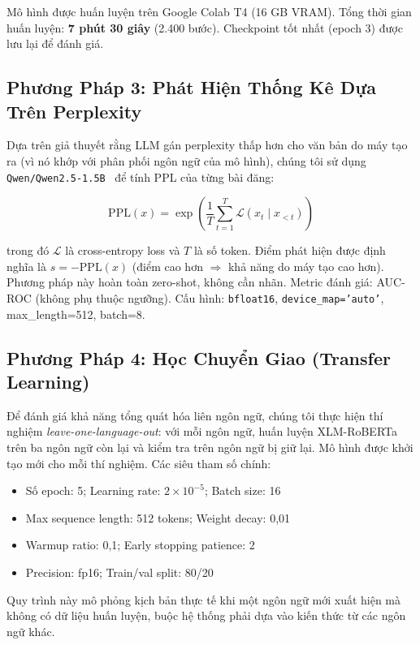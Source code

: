 Mô hình được huấn luyện trên Google Colab T4 (16 GB VRAM). Tổng thời
gian huấn luyện: \textbf{7 phút 30 giây} (2.400 bước). Checkpoint tốt
nhất (epoch 3) được lưu lại để đánh giá.

\subsection{Phương Pháp 3: Phát Hiện Thống Kê Dựa Trên Perplexity}

Dựa trên giả thuyết rằng LLM gán perplexity thấp hơn cho văn bản do
máy tạo ra (vì nó khớp với phân phối ngôn ngữ của mô hình), chúng tôi
sử dụng \texttt{Qwen/Qwen2.5-1.5B}~\cite{qwen2024qwen25} để tính PPL
của từng bài đăng:

\[
\text{PPL}(x) = \exp\!\left(\frac{1}{T}\sum_{t=1}^{T} \mathcal{L}(x_t \mid x_{<t})\right)
\]

trong đó $\mathcal{L}$ là cross-entropy loss và $T$ là số token. Điểm
phát hiện được định nghĩa là $s = -\text{PPL}(x)$ (điểm cao hơn $\Rightarrow$
khả năng do máy tạo cao hơn). Phương pháp này hoàn toàn zero-shot, không
cần nhãn. Metric đánh giá: AUC-ROC (không phụ thuộc ngưỡng). Cấu hình:
\texttt{bfloat16}, \texttt{device\_map='auto'}, max\_length=512, batch=8.

\subsection{Phương Pháp 4: Học Chuyển Giao (Transfer Learning)}

Để đánh giá khả năng tổng quát hóa liên ngôn ngữ, chúng tôi thực hiện
thí nghiệm \textit{leave-one-language-out}: với mỗi ngôn ngữ, huấn luyện
XLM-RoBERTa trên ba ngôn ngữ còn lại và kiểm tra trên ngôn ngữ bị giữ lại.
Mô hình được khởi tạo mới cho mỗi thí nghiệm. Các siêu tham số chính:

\begin{itemize}
    \item Số epoch: 5; Learning rate: $2 \times 10^{-5}$; Batch size: 16
    \item Max sequence length: 512 tokens; Weight decay: 0,01
    \item Warmup ratio: 0,1; Early stopping patience: 2
    \item Precision: fp16; Train/val split: 80/20
\end{itemize}

Quy trình này mô phỏng kịch bản thực tế khi một ngôn ngữ mới xuất hiện
mà không có dữ liệu huấn luyện, buộc hệ thống phải dựa vào kiến thức
từ các ngôn ngữ khác.
